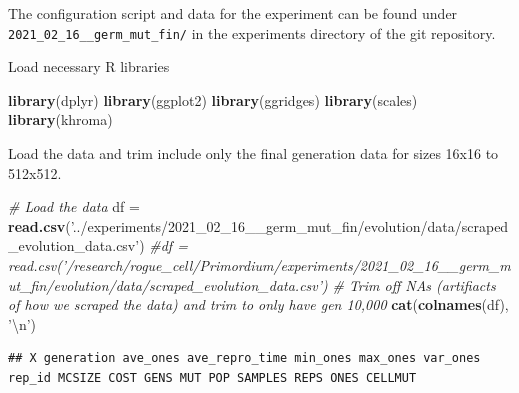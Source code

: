 \documentclass[]{book}
\newenvironment{Shaded}{\begin{snugshade}}{\end{snugshade}}
\newcommand{\CharTok}[1]{\textcolor[rgb]{0.31,0.60,0.02}{#1}}
\newcommand{\CommentTok}[1]{\textcolor[rgb]{0.56,0.35,0.01}{\textit{#1}}}
\newcommand{\DecValTok}[1]{\textcolor[rgb]{0.00,0.00,0.81}{#1}}
\newcommand{\KeywordTok}[1]{\textcolor[rgb]{0.13,0.29,0.53}{\textbf{#1}}}
\newcommand{\NormalTok}[1]{#1}
\newcommand{\OperatorTok}[1]{\textcolor[rgb]{0.81,0.36,0.00}{\textbf{#1}}}
\newcommand{\StringTok}[1]{\textcolor[rgb]{0.31,0.60,0.02}{#1}}
\begin{document}
The configuration script and data for the experiment can be found under \texttt{2021\_02\_16\_\_germ\_mut\_fin/} in the experiments directory of the git repository.

Load necessary R libraries

\begin{Shaded}
\begin{Highlighting}[]
\KeywordTok{library}\NormalTok{(dplyr)}
\KeywordTok{library}\NormalTok{(ggplot2)}
\KeywordTok{library}\NormalTok{(ggridges)}
\KeywordTok{library}\NormalTok{(scales)}
\KeywordTok{library}\NormalTok{(khroma)}
\end{Highlighting}
\end{Shaded}

Load the data and trim include only the final generation data for sizes 16x16 to 512x512.

\begin{Shaded}
\begin{Highlighting}[]
\CommentTok{# Load the data}
\NormalTok{df =}\StringTok{ }\KeywordTok{read.csv}\NormalTok{(}\StringTok{'../experiments/2021_02_16__germ_mut_fin/evolution/data/scraped_evolution_data.csv'}\NormalTok{)}
\CommentTok{#df = read.csv('/research/rogue_cell/Primordium/experiments/2021_02_16__germ_mut_fin/evolution/data/scraped_evolution_data.csv')}
\CommentTok{# Trim off NAs (artifiacts of how we scraped the data) and trim to only have gen 10,000}
\KeywordTok{cat}\NormalTok{(}\KeywordTok{colnames}\NormalTok{(df), }\StringTok{'}\CharTok{\textbackslash{}n}\StringTok{'}\NormalTok{)}
\end{Highlighting}
\end{Shaded}

\begin{verbatim}
## X generation ave_ones ave_repro_time min_ones max_ones var_ones rep_id MCSIZE COST GENS MUT POP SAMPLES REPS ONES CELLMUT
\end{verbatim}

\begin{Shaded}
\end{Shaded}
\end{document}
